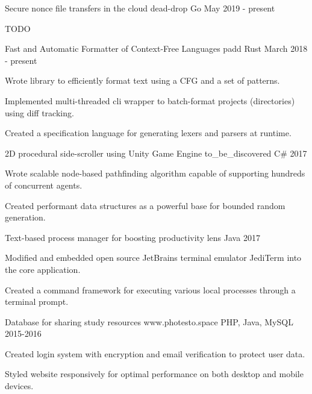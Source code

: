 
\begin{cventries}

\cventry
    {Secure nonce file transfers in the cloud}
    {dead-drop}
    {Go}
    {May 2019 - present}
    {
      \begin{cvitems}
      	\item TODO
      \end{cvitems}
    }

\cventry
    {Fast and Automatic Formatter of Context-Free Languages}
    {padd}
    {Rust}
    {March 2018 - present}
    {
      \begin{cvitems}
      	\item Wrote library to efficiently format text using a CFG and a set of patterns.
		\item  Implemented multi-threaded cli wrapper to batch-format projects (directories) using diff
		tracking.
		\item Created a specification language for generating lexers and parsers at runtime.
      \end{cvitems}
    }

\cventry
    {2D procedural side-scroller using Unity Game Engine}
    {to\_be\_discovered}
    {C\#}
    {2017}
    {
      \begin{cvitems}
      	\item Wrote scalable node-based pathfinding algorithm capable of supporting hundreds of concurrent
      	agents.
      	\item Created performant data structures as a powerful base for bounded random generation.
      \end{cvitems}
    }

\cventry
    {Text-based process manager for boosting productivity}
    {lens}
    {Java}
    {2017}
    {
      \begin{cvitems}
      	\item Modified and embedded open source JetBrains terminal emulator JediTerm into the core
      	application.
      	\item Created a command framework for executing various local processes through a terminal prompt.
      \end{cvitems}
    }

\cventry
    {Database for sharing study resources}
    {www.photesto.space}
    {PHP, Java, MySQL}
    {2015-2016}
    {
      \begin{cvitems}
      	\item Created login system with encryption and email verification to protect user data.
      	\item Styled website responsively for optimal performance on both desktop and mobile devices.
      \end{cvitems}
    }


\end{cventries}
